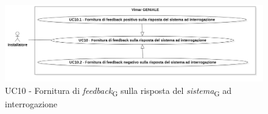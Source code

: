 \begin{figure}[H]
\centering
\includegraphics[width=1\textwidth]{contents/casi_duso/png/UC10.png}
\caption{UC10 - Fornitura di \textit{feedback}\textsubscript{G} sulla risposta del \textit{sistema}\textsubscript{G} ad interrogazione}
\end{figure}


